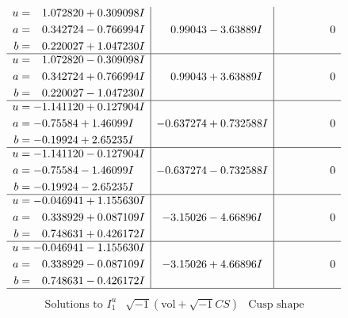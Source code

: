 \documentclass[1p]{elsarticle_modified}
\theoremstyle{definition}
\newcommand{\I}{\sqrt{-1}}
\begin{document}
$$\begin{array}{c|c|c}
\begin{aligned}
u &= \phantom{-}1.072820 + 0.309098 I \\
a &= \phantom{-}0.342724 - 0.766994 I \\
b &= \phantom{-}0.220027 + 1.047230 I\end{aligned}
 & \phantom{-}0.99043 - 3.63889 I & \phantom{-0.000000 } 0 \\ \hline\begin{aligned}
u &= \phantom{-}1.072820 - 0.309098 I \\
a &= \phantom{-}0.342724 + 0.766994 I \\
b &= \phantom{-}0.220027 - 1.047230 I\end{aligned}
 & \phantom{-}0.99043 + 3.63889 I & \phantom{-0.000000 } 0 \\ \hline\begin{aligned}
u &= -1.141120 + 0.127904 I \\
a &= -0.75584 + 1.46099 I \\
b &= -0.19924 + 2.65235 I\end{aligned}
 & -0.637274 + 0.732588 I & \phantom{-0.000000 } 0 \\ \hline\begin{aligned}
u &= -1.141120 - 0.127904 I \\
a &= -0.75584 - 1.46099 I \\
b &= -0.19924 - 2.65235 I\end{aligned}
 & -0.637274 - 0.732588 I & \phantom{-0.000000 } 0 \\ \hline\begin{aligned}
u &= -0.046941 + 1.155630 I \\
a &= \phantom{-}0.338929 + 0.087109 I \\
b &= \phantom{-}0.748631 + 0.426172 I\end{aligned}
 & -3.15026 - 4.66896 I & \phantom{-0.000000 } 0 \\ \hline\begin{aligned}
u &= -0.046941 - 1.155630 I \\
a &= \phantom{-}0.338929 - 0.087109 I \\
b &= \phantom{-}0.748631 - 0.426172 I\end{aligned}
 & -3.15026 + 4.66896 I & \phantom{-0.000000 } 0\\
 \hline 
 \end{array}$$\newpage$$\begin{array}{c|c|c}  
\text{Solutions to }I^u_{1}& \I (\text{vol} + \sqrt{-1}CS) & \text{Cusp shape}\\
 \hline 
\begin{aligned}

\end{aligned}
\end{array}$$
\end{document}
